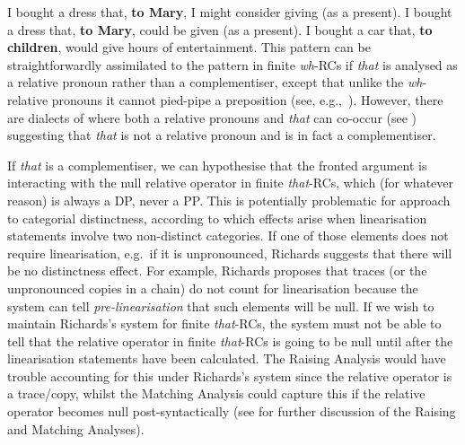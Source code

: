 \documentclass[output=paper]{langsci/langscibook}
\begin{document}
\ea\label{ex:key:2.98}
    \ea    I bought a dress that, \textbf{to Mary}, I might consider giving (as a present).
    \ex    I bought a dress that, \textbf{to Mary}, could be given (as a present).
    \ex    I bought a car that, \textbf{to children}, would give hours of entertainment.
    \z
\z
\ea\label{ex:key:2.99}
    \z
\z
This pattern can be straightforwardly assimilated to the pattern in finite
\emph{wh}{-\glspl{RC} if} \emph{that} is analysed as a relative
pronoun rather than a complementiser, except that unlike
the \emph{wh}{-relative pronouns it cannot pied-pipe a
preposition} (see, e.g.,~\citealt{Kayne2014}). However, there are dialects of
 where both a relative pronouns and \emph{that} can co-occur (see
\citealt[6]{Trotta2004}) suggesting that \emph{that} is not a relative pronoun
and is in fact a complementiser.

If \emph{that} is a complementiser, we can hypothesise that the fronted
argument is interacting with the null relative operator in finite
\emph{that}-RCs, which (for whatever reason) is always a DP, never a PP\@. This
is potentially problematic for  approach to categorial
distinctness, according to which  effects arise when
linearisation statements involve two non-distinct categories. If one of those
elements does not require linearisation, e.g.\ if it is unpronounced, Richards
suggests that there will be no distinctness effect. For example, Richards
proposes that traces (or the unpronounced copies in a  chain) do not
count for linearisation because the system can tell \emph{pre-linearisation}
that such elements will be null. If we wish to maintain Richards’s system for
finite \emph{that}{-RCs, the system must not be able to tell that the relative
    operator in finite} \emph{that}{-\glspl{RC} is going to be null until after the
linearisation statements have been calculated. The Raising Analysis would have
trouble accounting for this under Richards’s system} since the relative operator
is a trace/copy, whilst the Matching Analysis could capture this if the
relative operator becomes null post-syntactically (see \citealt{Douglas2016}
for further discussion of the Raising and Matching Analyses).
\end{document}
